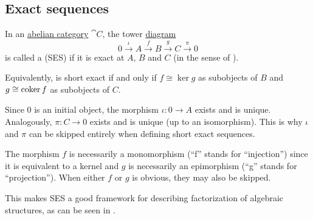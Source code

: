 \subsection{Exact sequences}\label{subsec:exact_sequences}

\begin{definition}\label{def:short_exact_sequence}\mcite\cite[196]{MacLane1994}
  In an \hyperref[def:abelian_category]{abelian category} \( \cat{C} \), the tower \hyperref[def:tower_diagram]{diagram}
  \begin{equation}\label{def:short_exact_sequence/diagram}
    0
    \overset \iota \longrightarrow
    A
    \overset f \longrightarrow
    B
    \overset g \longrightarrow
    C
    \overset \pi \longrightarrow
    0
  \end{equation}
  is called a  (SES) if it is exact at \( A \), \( B \) and \( C \) (in the sense of ).

  Equivalently,  is short exact if and only if \( f \cong \ker g \) as subobjects of \( B \) and \( g \cong \operatorname*{co\!\ker} f \) as subobjects of \( C \).
\end{definition}

\begin{remark}\label{rem:short_exact_sequence_factorization}
  Since \( 0 \) is an initial object, the morphism \( \iota: 0 \to A \) exists and is unique. Analogously, \( \pi: C \to 0 \) exists and is unique (up to an isomorphism). This is why \( \iota \) and \( \pi \) can be skipped entirely when defining short exact sequences.

  The morphism \( f \) is necessarily a monomorphism (\enquote{f} stands for \enquote{injection}) since it is equivalent to a kernel and \( g \) is necessarily an epimorphism (\enquote{g} stands for \enquote{projection}). When either \( f \) or \( g \) is obvious, they may also be skipped.

  This makes SES a good framework for describing factorization of algebraic structures, as can be seen in .
\end{remark}

